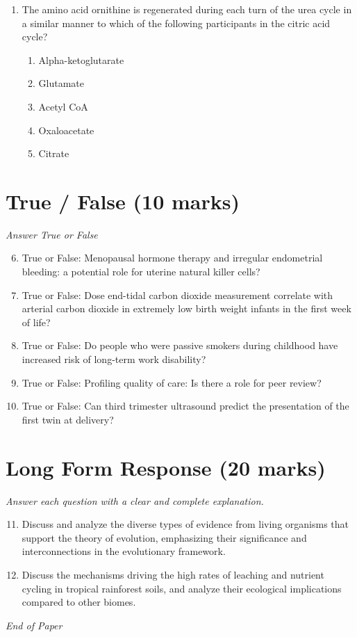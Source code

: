 \documentclass[12pt]{article}
\begin{document}
\begin{enumerate}[label=\arabic*.]
\begin{enumerate}[label=(\alph*)]
    \item Ribosome
    \item Mitochondrion
    \item Chloroplast
    \item Lysosome
    \item Endoplasmic reticulum
\end{enumerate}
\item The amino acid ornithine is regenerated during each turn of the urea cycle in a similar manner to which of the following participants in the citric acid cycle?
\begin{enumerate}[label=(\alph*)]
    \item Alpha-ketoglutarate
    \item Glutamate
    \item Acetyl CoA
    \item Oxaloacetate
    \item Citrate
\end{enumerate}
\end{enumerate}

\section*{True / False (10 marks)}
\textit{Answer True or False}
\begin{enumerate}[label=\arabic*.]
\setcounter{enumi}{5}
\item True or False: Menopausal hormone therapy and irregular endometrial bleeding: a potential role for uterine natural killer cells?
\item True or False: Dose end-tidal carbon dioxide measurement correlate with arterial carbon dioxide in extremely low birth weight infants in the first week of life?
\item True or False: Do people who were passive smokers during childhood have increased risk of long-term work disability?
\item True or False: Profiling quality of care: Is there a role for peer review?
\item True or False: Can third trimester ultrasound predict the presentation of the first twin at delivery?
\end{enumerate}

\section*{Long Form Response (20 marks)}
\textit{Answer each question with a clear and complete explanation.}
\begin{enumerate}[label=\arabic*.]
\setcounter{enumi}{10}
\item Discuss and analyze the diverse types of evidence from living organisms that support the theory of evolution, emphasizing their significance and interconnections in the evolutionary framework.
\item Discuss the mechanisms driving the high rates of leaching and nutrient cycling in tropical rainforest soils, and analyze their ecological implications compared to other biomes.
\end{enumerate}

\vfill
\noindent\textit{End of Paper}
\end{document}

